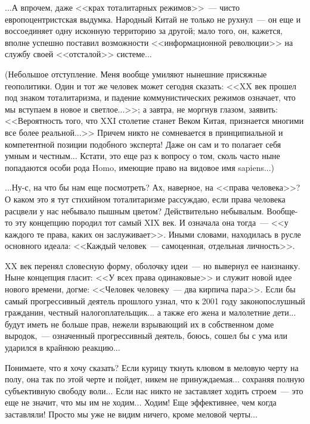 \documentclass{scrbook}
\newcommand{\flqq}{<<}
\newcommand{\frqq}{>>}
\newcommand{\mdash}{~--- }
\newcommand{\commamdash}{~--- } %
\begin{document}
...А впрочем, даже {\flqq}крах тоталитарных режимов{\frqq}{\mdash}чисто европоцентристская выдумка. Народный Китай не только не рухнул{\mdash}он еще и воссоединяет одну исконную территорию за другой; мало того, он, кажется, вполне успешно поставил возможности {\flqq}информационной революции{\frqq} на службу своей {\flqq}отсталой{\frqq} системе...

(Небольшое отступление. Меня вообще умиляют нынешние присяжные геополитики. Один и тот же человек может сегодня сказать: {\flqq}XX век прошел под знаком тоталитаризма, и падение коммунистических режимов означает, что мы вступаем в новое и светлое...{\frqq}; а завтра, не моргнув глазом, заявить: {\flqq}Вероятность того, что XXI столетие станет Веком Китая, признается многими все более реальной...{\frqq} Причем никто не сомневается в принципиальной и компетентной позиции подобного эксперта! Даже он сам и то полагает себя умным и честным... Кстати, это еще раз к вопросу о том, сколь часто ныне попадаются особи рода Homo, имеющие право на видовое имя sapiens...)

...Ну-с, на что бы нам еще посмотреть? Ах, наверное, на {\flqq}права человека{\frqq}? О каком это я тут стихийном тоталитаризме рассуждаю, если права человека расцвели у нас небывало пышным цветом? Действительно небывалым. Вообще-то эту концепцию породил тот самый XIX век. И означала она тогда{\mdash}{\flqq}у каждого те права, каких он заслуживает{\frqq}. Иными словами, находилась в русле основного идеала: {\flqq}Каждый человек{\mdash}самоценная, отдельная личность{\frqq}.

XX век перенял словесную форму, оболочку идеи{\mdash}но вывернул ее наизнанку. Ныне концепция гласит: {\flqq}У всех права одинаковые{\frqq} и служит новой идее нового времени, догме: {\flqq}Человек человеку{\mdash}два кирпича пара{\frqq}. Если бы самый прогрессивный деятель прошлого узнал, что к 2001 году законопослушный гражданин, честный налогоплательщик... а также его жена и малолетние дети... будут иметь не больше прав, нежели взрывающий их в собственном доме выродок,{\commamdash}означенный прогрессивный деятель, боюсь, сошел бы с ума или ударился в крайнюю реакцию...

Понимаете, что я хочу сказать? Если курицу ткнуть клювом в меловую черту на полу, она так по этой черте и пойдет, никем не принуждаемая... сохраняя полную субъективную свободу воли... Если нас никто не заставляет ходить строем{\mdash}это еще не значит, что мы им не ходим... Ходим! Еще эффективнее, чем когда заставляли! Просто мы уже не видим ничего, кроме меловой черты...
\end{document}
